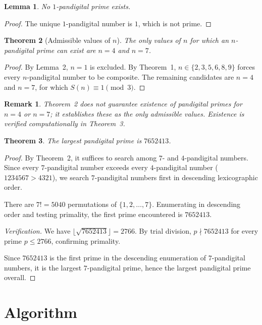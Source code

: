 \documentclass[12pt]{article}
\newtheorem{theorem}{Theorem}
\newtheorem{lemma}[theorem]{Lemma}
\newtheorem*{remark}{Remark}
\begin{document}
\begin{lemma}
No $1$-pandigital prime exists.
\end{lemma}

\begin{proof}
The unique $1$-pandigital number is $1$, which is not prime.
\end{proof}

\begin{theorem}[Admissible values of $n$]
The only values of $n$ for which an $n$-pandigital prime can exist are $n = 4$ and $n = 7$.
\end{theorem}

\begin{proof}
By Lemma~2, $n = 1$ is excluded. By Theorem~1, $n \in \{2,3,5,6,8,9\}$ forces every $n$-pandigital number to be composite. The remaining candidates are $n = 4$ and $n = 7$, for which $S(n) \equiv 1 \pmod{3}$.
\end{proof}

\begin{remark}
Theorem~2 does not guarantee existence of pandigital primes for $n = 4$ or $n = 7$; it establishes these as the only admissible values. Existence is verified computationally in Theorem~3.
\end{remark}

\begin{theorem}
The largest pandigital prime is $7652413$.
\end{theorem}

\begin{proof}
By Theorem~2, it suffices to search among $7$- and $4$-pandigital numbers. Since every $7$-pandigital number exceeds every $4$-pandigital number ($1234567 > 4321$), we search $7$-pandigital numbers first in descending lexicographic order.

There are $7! = 5040$ permutations of $\{1,2,\ldots,7\}$. Enumerating in descending order and testing primality, the first prime encountered is $7652413$.

\emph{Verification.} We have $\lfloor \sqrt{7652413} \rfloor = 2766$. By trial division, $p \nmid 7652413$ for every prime $p \leq 2766$, confirming primality.

Since $7652413$ is the first prime in the descending enumeration of $7$-pandigital numbers, it is the largest $7$-pandigital prime, hence the largest pandigital prime overall.
\end{proof}

\section{Algorithm}
\end{document}
